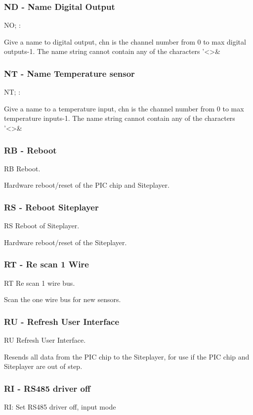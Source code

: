 \subsubsection{ND - Name Digital Output}
NO; :

Give a name to digital output, chn is the channel number from 0 to max digital outputs-1.
The name string cannot contain any of the characters '\textless{}\textgreater{}\&

\subsubsection{NT - Name Temperature sensor}
NT; :

Give a name to a temperature input, chn is the channel number from 0 to max temperature inputs-1.
The name string cannot contain any of the characters '\textless{}\textgreater{}\&

\subsubsection{RB - Reboot}
RB  Reboot.

Hardware reboot/reset of the PIC chip and Siteplayer.

\subsubsection{RS - Reboot Siteplayer}
RS  Reboot of Siteplayer.

Hardware reboot/reset of the Siteplayer.

\subsubsection{RT - Re scan 1 Wire}
RT  Re scan 1 wire bus.

Scan the one wire bus for new sensors.

\subsubsection{RU - Refresh User Interface}
RU  Refresh User Interface.

Resends all data from the PIC chip to the Siteplayer, for use if the PIC chip and Siteplayer are out of step.

\subsubsection{RI - RS485 driver off}
RI:
Set RS485 driver off, input mode

